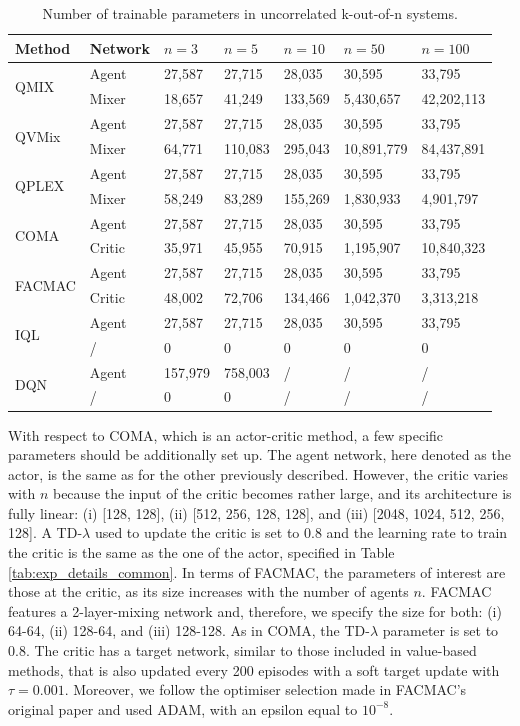 \begin{table}
    \caption{Number of trainable parameters in uncorrelated k-out-of-n systems.}
    \centering
    \setlength\tabcolsep{4.5pt}
    \begin{tabular}{lllllll}
    \toprule
    Method & Network & $n=3$ & $n=5$ & $n=10$ & $n=50$ & $n=100$ \\
    \midrule
    \multirow{2}{*}{QMIX} & Agent & 27,587 & 27,715 & 28,035 & 30,595 & 33,795 \\
 & Mixer & 18,657 & 41,249 & 133,569 & 5,430,657 & 42,202,113 \\
\multirow{2}{*}{QVMix} & Agent & 27,587 & 27,715 & 28,035 & 30,595 & 33,795 \\
 & Mixer & 64,771 & 110,083 & 295,043 & 10,891,779 & 84,437,891 \\
\multirow{2}{*}{QPLEX} & Agent & 27,587 & 27,715 & 28,035 & 30,595 & 33,795 \\
 & Mixer & 58,249 & 83,289 & 155,269 & 1,830,933 & 4,901,797 \\
\multirow{2}{*}{COMA} & Agent & 27,587 & 27,715 & 28,035 & 30,595 & 33,795 \\
 & Critic & 35,971 & 45,955 & 70,915 & 1,195,907 & 10,840,323 \\
\multirow{2}{*}{FACMAC} & Agent & 27,587 & 27,715 & 28,035 & 30,595 & 33,795 \\
 & Critic & 48,002 & 72,706 & 134,466 & 1,042,370 & 3,313,218 \\
\multirow{2}{*}{IQL} & Agent & 27,587 & 27,715 & 28,035 & 30,595 & 33,795 \\
 & / & 0 & 0 & 0 & 0 & 0 \\
\multirow{2}{*}{DQN} & Agent & 157,979 & 758,003 & / & / & / \\
 & / & 0 & 0 & / & / & / \\
    \bottomrule
    \end{tabular}
    \label{tab:n_param_train}
\end{table}

With respect to COMA, which is an actor-critic method, a few specific parameters should be additionally set up.
The agent network, here denoted as the actor, is the same as for the other previously described.
However, the critic varies with $n$ because the input of the critic becomes rather large, and its architecture is fully linear: (i) [128, 128], (ii) [512, 256, 128, 128], and (iii) [2048, 1024, 512, 256, 128].
A TD-$\lambda$ used to update the critic is set to $0.8$ and the learning rate to train the critic is the same as the one of the actor, specified in Table \ref{tab:exp_details_common}.
In terms of FACMAC, the parameters of interest are those at the critic, as its size increases with the number of agents $n$.
FACMAC features a 2-layer-mixing network and, therefore, we specify the size for both:
(i) 64-64, (ii) 128-64, and (iii) 128-128.
As in COMA, the TD-$\lambda$ parameter is set to $0.8$.
The critic has a target network, similar to those included in value-based methods, that is also updated every 200 episodes with a soft target update with $\tau=0.001$.
Moreover, we follow the optimiser selection made in FACMAC's original paper and used ADAM, with an epsilon equal to $10^{-8}$.

